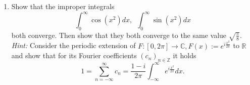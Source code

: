 \documentclass{article}
\begin{document}
\begin{enumerate}[font = \Large\bfseries\itshape\space, leftmargin = 3mm, labelsep = 3mm]
\begin{enumerate}[label=(\roman*)]
\item $F_n[f] \rightarrow f$ uniformly, i.e. the Fourier series of $f$ converges uniformly to $f$.
\end{enumerate}

\begin{proof}
\begin{enumerate}[label=(\roman*)]
\item
By assumption, $f$ is integrable on any interval $[a,b] \subset [0,2\pi]$.
Therefore, we can apply Fubini's theorem.
$$
\begin{aligned}
c_n &= \int_0^{2\pi} f(x)e^{-inx}dx\\
&= \int_0^{2\pi} \left(\int_0^x f'(y)dy\right)e^{-inx}dx\\
&= \int_0^{2\pi} \int_0^{x} f'(y) e^{-inx}dydx\\
&= \int_{0 \leq x \leq y \leq 2\pi} f'(y)e^{-inx} dA\\
&= \int_0^{2\pi} \int_0^{y} f'(y)e^{-inx}dxdy\\
&= \int_0^{2\pi} f'(y) \frac{e^{-iny}-1}{in}dy\\
&= -\frac{i}{n} \int_0^{2\pi} f'(y) e^{-iny}dy + \frac{i}{n}(f(2\pi) - f(0))\\
&= \frac{-i\gamma_n}{n}
\end{aligned}
$$
for $ n\neq 0$.

\item
Note that $f$ is complex-valued function and $C^1$ in $\mathbb{C}$ is equivalent to $C^\infty$ in $\mathbb{C}$.

By Bessel's inequality $\sum |c_n| = \sum \frac{\gamma_n}{n} \leq (\sum \frac{1}{n^2})^{1/2} (\sum \gamma_n^2)^{1/2} < \infty$, therefore $|c_n|$ converges absolutely and $F_n(f)$ converges absolutely.
The sum of the Fourier series converges pointwise to $f$ everywhere since $f$ is continuous (i.e. no jump anywhere).
Therefore,
$\sup |f(x)-F_n(f)(x)| \leq \sup \{\sum_{k=n+1}^\infty |c_ke^{ikx}|\} \leq \sum_{k=n+1}^\infty |c_n| \rightarrow 0$.
Therefore, $F_n(x) \rightarrow f$ uniformly.
\end{enumerate}
\end{proof}

\item
Show that the improper integrals
$$\int_0^\infty \cos(x^2)dx, \enspace \int_0^\infty \sin(x^2)dx$$
both converge.
Then show that they both converge to the same value $\sqrt{\frac{\pi}{8}}$.\\
\textit{Hint:} Consider the periodic extension of $F : [0,2\pi] \rightarrow \mathbb{C}, F(x) := e^{i\frac{x^2}{2\pi}}$ to $\mathbb{R}$ and show that for its Fourier coefficients $(c_n)_{n\in\mathbb{Z}}$ it holds
$$1 = \sum_{n=-\infty}^\infty c_n = \frac{1-i}{2\pi} \int_{-\infty}^\infty e^{i\frac{x^2}{2\pi}}dx.$$


\end{enumerate}
\end{document}
